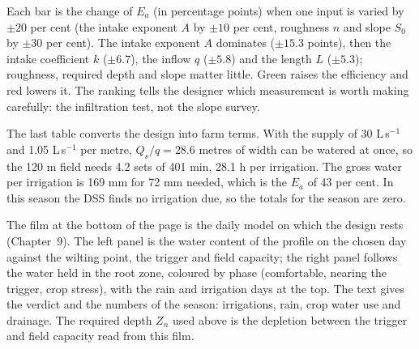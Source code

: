 
Each bar is the change of $E_a$ (in percentage points) when one input is varied by $\pm20$ per cent (the intake exponent $A$ by $\pm10$ per cent, roughness $n$ and slope $S_0$ by $\pm30$ per cent). The intake exponent $A$ dominates ($\pm15.3$ points), then the intake coefficient $k$ ($\pm6.7$), the inflow $q$ ($\pm5.8$) and the length $L$ ($\pm5.3$); roughness, required depth and slope matter little. Green raises the efficiency and red lowers it. The ranking tells the designer which measurement is worth making carefully: the infiltration test, not the slope survey.


The last table converts the design into farm terms. With the supply of 30 L\,s$^{-1}$ and 1.05 L\,s$^{-1}$ per metre, $Q_s/q=28.6$ metres of width can be watered at once, so the 120 m field needs 4.2 sets of 401 min, 28.1 h per irrigation. The gross water per irrigation is 169 mm for 72 mm needed, which is the $E_a$ of 43 per cent. In this season the DSS finds no irrigation due, so the totals for the season are zero.


The film at the bottom of the page is the daily model on which the design rests (Chapter~9). The left panel is the water content of the profile on the chosen day against the wilting point, the trigger and field capacity; the right panel follows the water held in the root zone, coloured by phase (comfortable, nearing the trigger, crop stress), with the rain and irrigation days at the top. The text gives the verdict and the numbers of the season: irrigations, rain, crop water use and drainage. The required depth $Z_n$ used above is the depletion between the trigger and field capacity read from this film.


